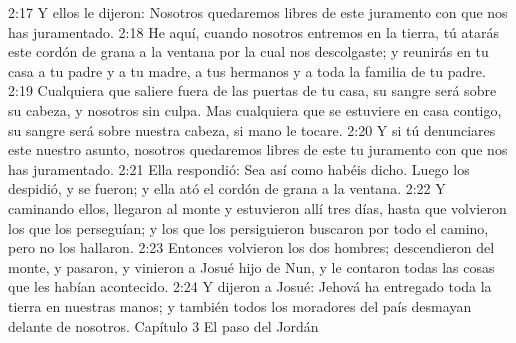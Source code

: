 2:17 Y ellos le dijeron: Nosotros quedaremos libres de este juramento con que nos has juramentado.  
2:18 He aquí, cuando nosotros entremos en la tierra, tú atarás este cordón de grana a la ventana por la cual nos descolgaste; y reunirás en tu casa a tu padre y a tu madre, a tus hermanos y a toda la familia de tu padre.  
2:19 Cualquiera que saliere fuera de las puertas de tu casa, su sangre será sobre su cabeza, y nosotros sin culpa. Mas cualquiera que se estuviere en casa contigo, su sangre será sobre nuestra cabeza, si mano le tocare.  
2:20 Y si tú denunciares este nuestro asunto, nosotros quedaremos libres de este tu juramento con que nos has juramentado.  
2:21 Ella respondió: Sea así como habéis dicho. Luego los despidió, y se fueron; y ella ató el cordón de grana a la ventana.  
2:22 Y caminando ellos, llegaron al monte y estuvieron allí tres días, hasta que volvieron los que los perseguían; y los que los persiguieron buscaron por todo el camino, pero no los hallaron.  
2:23 Entonces volvieron los dos hombres; descendieron del monte, y pasaron, y vinieron a Josué hijo de Nun, y le contaron todas las cosas que les habían acontecido.  
2:24 Y dijeron a Josué: Jehová ha entregado toda la tierra en nuestras manos; y también todos los moradores del país desmayan delante de nosotros.  
Capítulo 3
El paso del Jordán  

